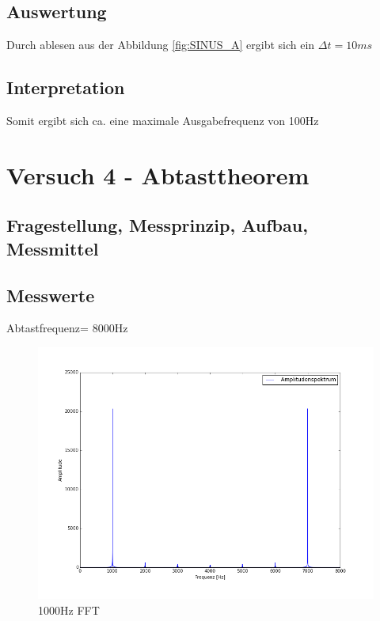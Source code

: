\documentclass[12pt,oneside,a4paper]{report}
\begin{document}
\section{Auswertung}
\label{chap:VERSUCH_3_AUSWERTUNG}
Durch ablesen aus der Abbildung \ref{fig:SINUS_A} ergibt sich ein $\Delta t = 10ms$ 

\section{Interpretation}
\label{chap:VERSUCH_3_INTERPRETATION}
Somit ergibt sich ca. eine maximale Ausgabefrequenz von 100Hz


%
%
\chapter{Versuch 4 - Abtasttheorem}
\label{chap:VERSUCH_4}

\section{Fragestellung, Messprinzip, Aufbau, Messmittel}
\label{chap:VERSUCH_4_FRAGESTELLUNG}

\section{Messwerte}
\label{chap:VERSUCH_4_MESSWERTE}
Abtastfrequenz= 8000Hz

\begin{figure}[H]
\centering\small
\includegraphics[scale=0.4]{src/1000fft.png}
\caption{1000Hz FFT}
\label{fig:1000_FFT}
\end{figure}
\end{document}
